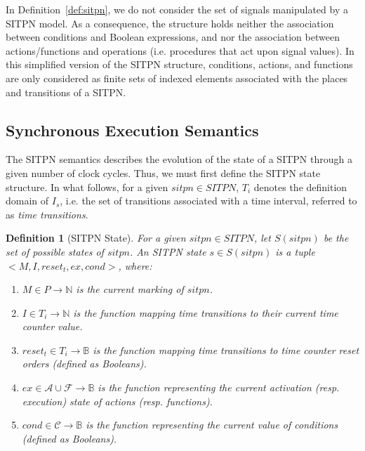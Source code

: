 \documentclass[pdflatex,sn-mathphys]{sn-jnl}%
\theoremstyle{thmstyleone}%
\theoremstyle{thmstyletwo}%
\theoremstyle{thmstylethree}%
\newtheorem{definition}{Definition}%
\begin{document}
In Definition~\ref{def:sitpn}, we do not consider the set of \vhdl{}
signals manipulated by a SITPN model. As a consequence, the structure
holds neither the association between conditions and Boolean
expressions, and nor the association between actions/functions and
operations (i.e. \vhdl{} procedures that act upon signal values).  In
this simplified version of the SITPN structure, conditions, actions,
and functions are only considered as finite sets of indexed elements
associated with the places and transitions of a SITPN.

\subsection{Synchronous Execution Semantics}
\label{subsec:hpn-particularities}

The SITPN semantics describes the evolution of the state of a SITPN
through a given number of clock cycles. Thus, we must first define the
SITPN state structure. In what follows, for a given $sitpn\in{}SITPN$,
$T_i$ denotes the definition domain of $I_s$, i.e. the set of
transitions associated with a time interval, referred to as
\textit{time transitions}.

\begin{definition}[SITPN State]
  \label{def:sitpnstate}
  For a given $sitpn\in{}SITPN$, let $S(sitpn)$ be the set of possible
  states of $sitpn$. An SITPN state $s\in{}S(sitpn)$ is a tuple
  ${<}M,I,reset_t,ex,cond{>}$, where:
  \begin{enumerate}
  \item $M\in{}P\rightarrow\mathbb{N}$ is the current marking of
    $sitpn$.
  \item\label{item:sitpn-state-tc} $I\in{}T_i{}\rightarrow\mathbb{N}$
    is the function mapping time transitions to their current time
    counter value.
  \item\label{item:sitpn-state-rst}
    $reset_t\in{}T_i\rightarrow\mathbb{B}$ is the function mapping
    time transitions to time counter reset orders (defined as
    Booleans).
  \item $ex\in{}\mathcal{A}\cup\mathcal{F}\rightarrow\mathbb{B}$ is
    the function representing the current activation (resp. execution)
    state of actions (resp. functions).
  \item $cond\in\mathcal{C}\rightarrow\mathbb{B}$ is the function representing the
    current value of conditions (defined as Booleans).
  \end{enumerate}
\end{definition}
\end{document}
